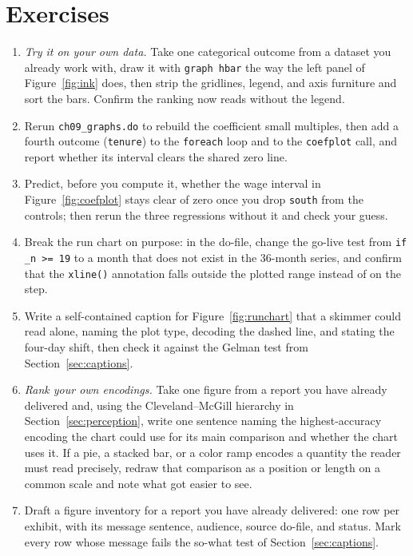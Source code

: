 \section*{Exercises}
\begin{enumerate}
  \item \emph{Try it on your own data.} Take one categorical
        outcome from a dataset you already work with, draw it
        with \texttt{graph hbar} the way the left panel of
        Figure~\ref{fig:ink} does, then strip the gridlines,
        legend, and axis furniture and sort the bars. Confirm
        the ranking now reads without the legend.
  \item Rerun \texttt{ch09\_graphs.do} to rebuild the coefficient
        small multiples, then add a fourth outcome
        (\texttt{tenure}) to the \texttt{foreach} loop and to the
        \texttt{coefplot} call, and report whether its interval
        clears the shared zero line.
  \item Predict, before you compute it, whether the wage
        interval in Figure~\ref{fig:coefplot} stays clear of zero
        once you drop \texttt{south} from the controls; then rerun
        the three regressions without it and check your guess.
  \item Break the run chart on purpose: in the do-file, change
        the go-live test from \texttt{if \_n >= 19} to a month
        that does not exist in the 36-month series, and confirm
        that the \texttt{xline()} annotation falls outside the plotted
        range instead of on the step.
  \item Write a self-contained caption for
        Figure~\ref{fig:runchart} that a skimmer could read alone,
        naming the plot type, decoding the dashed line, and
        stating the four-day shift, then check it against the
        Gelman test from Section~\ref{sec:captions}.
  \item \emph{Rank your own encodings.} Take one figure from a
        report you have already delivered and, using the
        Cleveland--McGill hierarchy in Section~\ref{sec:perception},
        write one sentence naming the highest-accuracy encoding the
        chart could use for its main comparison and whether the
        chart uses it. If a pie, a stacked bar, or a color ramp encodes
        a quantity the reader must read precisely, redraw
        that comparison as a position or length on a common scale
        and note what got easier to see.
  \item Draft a figure inventory for a report you have already
        delivered: one row per exhibit, with its message sentence,
        audience, source do-file, and status. Mark every row whose
        message fails the so-what test of
        Section~\ref{sec:captions}.
\end{enumerate}
